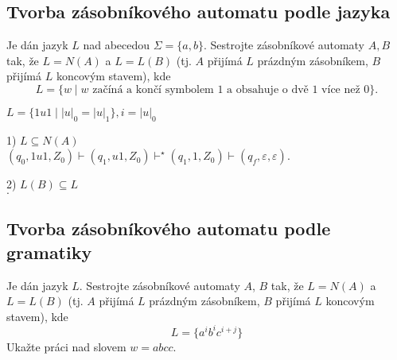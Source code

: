 \subsection{Tvorba zásobníkového automatu podle jazyka}
Je dán jazyk $L$ nad abecedou $\Sigma = \{a,b\}$. Sestrojte zásobníkové automaty $A,B$ tak, že $L = N(A)$ a $L = L(B)$ 
(tj. $A$ přijímá $L$ prázdným zásobníkem, $B$ přijímá $L$ koncovým stavem), kde
\[L = \{w \mid w \text{ začíná a končí symbolem } 1 \text{ a obsahuje o dvě } 1 \text{ více než } 0\}\text{.}\]
\begin{multicols}{2}
    $L = \{1u1 \mid |u|_0 = |u|_1\}, i = |u|_0$


    \columnbreak

    1) $L \subseteq N(A)$\\
    $(q_0, 1u1, Z_0) \vdash (q_1, u1, Z_0) \vdash^\star (q_1, 1, Z_0) \vdash (q_f, \varepsilon, \varepsilon)$.

    2) $L(B) \subseteq L$\\

    $.$

\end{multicols}

\subsection{Tvorba zásobníkového automatu podle gramatiky}
Je dán jazyk $L$. Sestrojte zásobníkové automaty $A$, $B$ tak, že $L = N(A)$ a $L = L(B)$ (tj. $A$ přijímá $L$ prázdným zásobníkem, $B$ přijímá $L$ koncovým stavem), kde $$L = \{a^i b^i c^{i+j}\}$$
Ukažte práci nad slovem $w = abcc$. 

